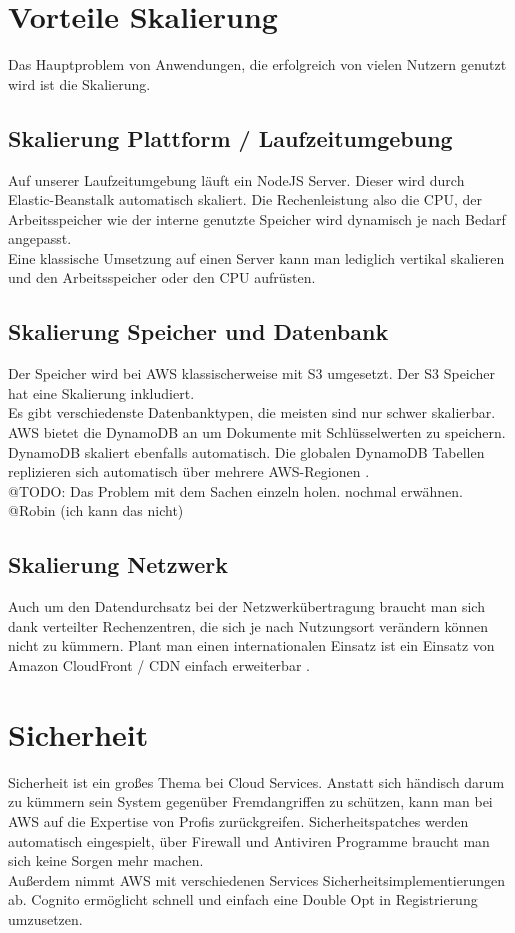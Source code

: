 \documentclass[a4paper, 12pt]{scrreprt}
\renewcommand\_{\textunderscore\allowbreak}
\begin{document}
\section{Vorteile Skalierung}
Das Hauptproblem von Anwendungen, die erfolgreich von vielen Nutzern genutzt wird ist die Skalierung.
\subsection{Skalierung Plattform / Laufzeitumgebung}
Auf unserer Laufzeitumgebung läuft ein NodeJS Server. Dieser wird durch Elastic-Beanstalk automatisch skaliert. Die Rechenleistung also die CPU, der Arbeitsspeicher wie der interne genutzte Speicher wird dynamisch je nach Bedarf angepasst. \\
Eine klassische Umsetzung auf einen Server kann man lediglich vertikal skalieren und den Arbeitsspeicher oder den CPU aufrüsten. 
\subsection{Skalierung Speicher und Datenbank}
Der Speicher wird bei AWS klassischerweise mit S3 umgesetzt. Der S3 Speicher hat eine Skalierung inkludiert. \\
Es gibt verschiedenste Datenbanktypen, die meisten sind nur schwer skalierbar. AWS bietet die DynamoDB an um Dokumente mit Schlüsselwerten zu speichern. DynamoDB skaliert ebenfalls automatisch. Die globalen DynamoDB Tabellen replizieren sich automatisch über mehrere AWS-Regionen \cite{AWSa}.\\
@TODO: Das Problem mit dem Sachen einzeln holen. nochmal erwähnen. @Robin (ich kann das nicht)
\subsection{Skalierung Netzwerk}
Auch um den Datendurchsatz bei der Netzwerkübertragung  braucht man sich dank verteilter Rechenzentren, die sich je nach Nutzungsort verändern können nicht zu kümmern. Plant man einen internationalen Einsatz ist ein Einsatz von Amazon CloudFront / CDN einfach erweiterbar \cite{AWSb}.%
\section{Sicherheit}
Sicherheit ist ein großes Thema bei Cloud Services. Anstatt sich händisch darum zu kümmern sein System gegenüber Fremdangriffen zu schützen, kann man bei AWS auf die Expertise von Profis zurückgreifen. Sicherheitspatches werden automatisch eingespielt, über Firewall und Antiviren Programme braucht man sich keine Sorgen mehr machen. \\
Außerdem nimmt AWS mit verschiedenen Services Sicherheitsimplementierungen ab. Cognito ermöglicht schnell und einfach eine Double Opt in Registrierung umzusetzen.
\end{document}
